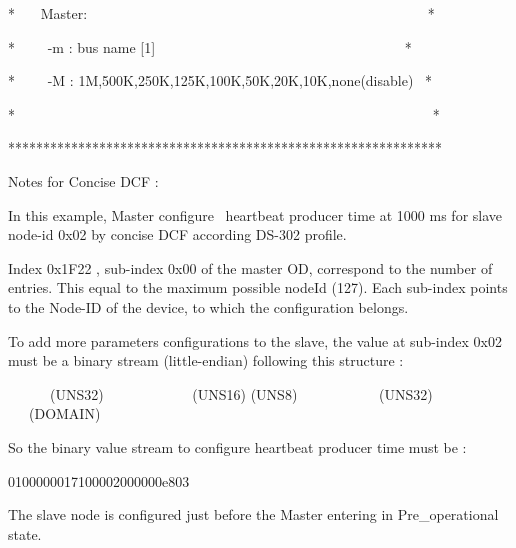 \documentclass[12pt,twoside]{article}
\begin{document}
{\ttfamily
* \ \ \ Master:
\ \ \ \ \ \ \ \ \ \ \ \ \ \ \ \ \ \ \ \ \ \ \ \ \ \ \ \ \ \ \ \ \ \ \ \ \ \ \ \ \ \ \ \ \ \ \ \ *}

{\ttfamily
* \ \ \ \ {}-m : bus name [{\textquotedbl}1{\textquotedbl}]
\ \ \ \ \ \ \ \ \ \ \ \ \ \ \ \ \ \ \ \ \ \ \ \ \ \ \ \ \ \ \ \ \ \ \ *}

{\ttfamily
* \ \ \ \ {}-M : 1M,500K,250K,125K,100K,50K,20K,10K,none(disable) \ *}

{\ttfamily
*
\ \ \ \ \ \ \ \ \ \ \ \ \ \ \ \ \ \ \ \ \ \ \ \ \ \ \ \ \ \ \ \ \ \ \ \ \ \ \ \ \ \ \ \ \ \ \ \ \ \ \ \ \ \ \ \ \ \ \ *}

{\ttfamily
**************************************************************}


\bigskip

{\sffamily
Notes for Concise DCF :}


\bigskip

{\sffamily
 In this example, Master configure \ heartbeat producer time at 1000 ms
for slave node{}-id 0x02 by concise DCF according DS{}-302 profile. }

{\sffamily
 }

{\sffamily
 Index 0x1F22 , sub{}-index 0x00 of the master OD, correspond to the
number of entries. This equal to the maximum possible nodeId (127).
Each sub{}-index points to the Node{}-ID of the device, to which the
configuration belongs. }


\bigskip

{\sffamily
 To add more parameters configurations to the slave, the value at
sub{}-index 0x02 must be a binary stream (little{}-endian) following
this structure :}

{\sffamily
    }

{}

{\sffamily
\ \ \ \ \ \ (UNS32) \ \ \ \ \ \ \ \ \ \ \ \ (UNS16)  (UNS8)  
\ \ \ \ \ \ \ \ \ \ \ (UNS32)   \ \ \ (DOMAIN)}

{\sffamily
 }

{\sffamily
 So the binary value stream to configure heartbeat producer time must be
: }


\bigskip

{\sffamily
    0100000017100002000000e803}


\bigskip

{\sffamily
The slave node is configured just before the Master entering in
Pre\_operational state.}
\end{document}
